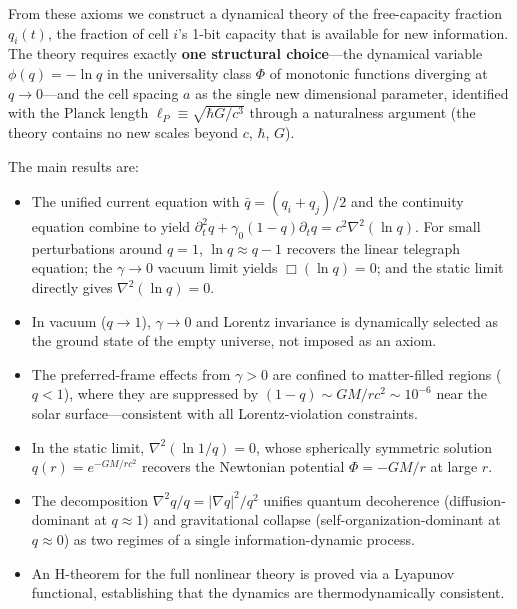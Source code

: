 \documentclass[aps,prd,twocolumn,showpacs,superscriptaddress,preprintnumbers]{revtex4-2}
\begin{document}
From these axioms we construct a dynamical theory of the free-capacity fraction $q_i(t)$, the fraction of cell $i$'s 1-bit capacity that is available for new information.
The theory requires exactly \textbf{one structural choice}---the dynamical variable $\phi(q)=-\ln q$ in the universality class $\Phi$ of monotonic functions diverging at $q\to0$---and the cell spacing $a$ as the single new dimensional parameter, identified with the Planck length $\ell_P\equiv\sqrt{\hbar G/c^3}$ through a naturalness argument (the theory contains no new scales beyond $c$, $\hbar$, $G$).

The main results are:

\begin{itemize}
    \item The unified current equation with $\bar{q}=(q_i+q_j)/2$ and the continuity equation combine to yield $\partial_t^2 q + \gamma_0(1-q)\partial_t q = c^2\nabla^2(\ln q)$. For small perturbations around $q=1$, $\ln q\approx q-1$ recovers the linear telegraph equation; the $\gamma\to0$ vacuum limit yields $\Box(\ln q)=0$; and the static limit directly gives $\nabla^2(\ln q)=0$.
    \item In vacuum ($q\to1$), $\gamma\to0$ and Lorentz invariance is dynamically selected as the ground state of the empty universe, not imposed as an axiom.
    \item The preferred-frame effects from $\gamma>0$ are confined to matter-filled regions ($q<1$), where they are suppressed by $(1-q)\sim GM/rc^2\sim10^{-6}$ near the solar surface---consistent with all Lorentz-violation constraints.
    \item In the static limit, $\nabla^2(\ln 1/q)=0$, whose spherically symmetric solution $q(r)=e^{-GM/rc^2}$ recovers the Newtonian potential $\Phi=-GM/r$ at large $r$.
    \item The decomposition $\nabla^2 q/q = |\nabla q|^2/q^2$ unifies quantum decoherence (diffusion-dominant at $q\approx1$) and gravitational collapse (self-organization-dominant at $q\approx0$) as two regimes of a single information-dynamic process.
    \item An H-theorem for the full nonlinear theory is proved via a Lyapunov functional, establishing that the dynamics are thermodynamically consistent.
\end{itemize}
\end{document}
